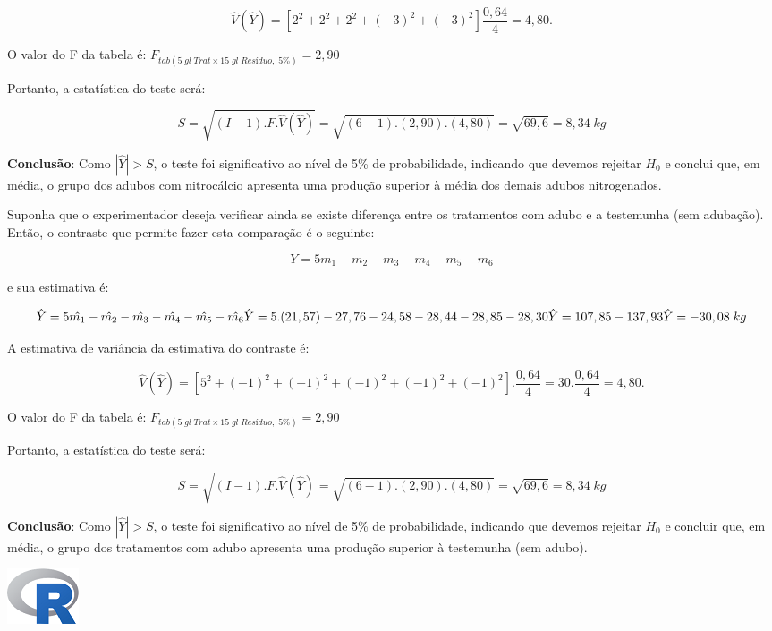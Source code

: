 \documentclass[
]{book}
\begin{document}
\[
\hat{V}(\hat{Y}) = [2^2+2^2+2^2+(-3)^2+(-3)^2] \frac{0,64}{4} = 4,80.
\]

O valor do F da tabela é: \(F_{tab(5\;gl\;Trat \times 15\;gl\;Resíduo,\;5\%)} = 2,90\)

Portanto, a estatística do teste será:

\[
S = \sqrt{(I-1).F.\hat{V}(\hat{Y})} =  \sqrt{(6-1).(2,90).(4,80)} = \sqrt{69,6} = 8,34\; kg
\]

\textbf{Conclusão}: Como \(|\hat{Y}| > S\), o teste foi significativo ao nível de 5\% de probabilidade, indicando que devemos rejeitar \(H_0\) e conclui que, em média, o grupo dos adubos com nitrocálcio apresenta uma produção superior à média dos demais adubos nitrogenados.

Suponha que o experimentador deseja verificar ainda se existe diferença entre os tratamentos com adubo e a testemunha (sem adubação). Então, o contraste que permite fazer esta comparação é o seguinte:

\[
Y = 5m_1 - m_2 - m_3 - m_4 - m_5 - m_6
\]

e sua estimativa é:

\[
\hat{Y} = 5\hat{m_1} - \hat{m_2} - \hat{m_3} - \hat{m_4} - \hat{m_5} - \hat{m_6} \\
\hat{Y} = 5.(21,57)-27,76-24,58-28,44-28,85-28,30\\
\hat{Y} = 107,85-137,93\\
\hat{Y} = -30,08\;kg
\]

A estimativa de variância da estimativa do contraste é:

\[
\hat{V}(\hat{Y}) = [5^2+(-1)^2+(-1)^2+(-1)^2+(-1)^2+(-1)^2].\frac{0,64}{4} = 30.\frac{0,64}{4} = 4,80.
\]

O valor do F da tabela é: \(F_{tab(5\;gl\;Trat \times 15\;gl\;Resíduo,\;5\%)} = 2,90\)

Portanto, a estatística do teste será:

\[
S = \sqrt{(I-1).F.\hat{V}(\hat{Y})} =  \sqrt{(6-1).(2,90).(4,80)} = \sqrt{69,6} = 8,34\; kg
\]

\textbf{Conclusão}: Como \(|\hat{Y}| > S\), o teste foi significativo ao nível de 5\% de probabilidade, indicando que devemos rejeitar \(H_0\) e concluir que, em média, o grupo dos tratamentos com adubo apresenta uma produção superior à testemunha (sem adubo).

\includegraphics{Rlogo.png}
\end{document}
